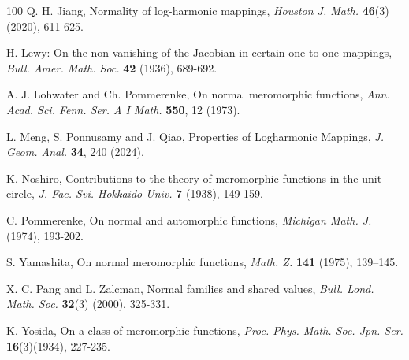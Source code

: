 \documentclass[a4paper,12pt]{amsart}
\theoremstyle{plain}
\theoremstyle{definition}
\begin{document}
\begin{thebibliography}{100}
	 {\sc Q. H. Jiang}, Normality of log-harmonic mappings, \textit{Houston J. Math.} \textbf{46}(3) (2020), 611-625.
	
	 {\sc H. Lewy}: On the non-vanishing of the Jacobian in certain one-to-one mappings, \textit{Bull. Amer. Math. Soc.} \textbf{42} (1936), 689-692.
	
	 {\sc A. J. Lohwater} and {\sc Ch. Pommerenke}, On normal meromorphic functions, \textit{Ann. Acad. Sci. Fenn. Ser. A I Math.} \textbf{550}, 12 (1973).
	
	 {\sc L. Meng, S. Ponnusamy} and {\sc J. Qiao}, Properties of Logharmonic Mappings, \textit{J. Geom. Anal.} \textbf{34}, 240 (2024).
	
	 {\sc K. Noshiro}, Contributions to the theory of meromorphic functions in the unit circle, \textit{J. Fac. Svi. Hokkaido Univ.} \textbf{7} (1938), 149-159.
	
	 {\sc C. Pommerenke}, On normal and automorphic functions, \textit{Michigan Math. J.} (1974), 193-202. 
	
	 {\sc S. Yamashita}, On normal meromorphic functions, \textit{Math. Z.} \textbf{141} (1975), 139–145.
	
	 {\sc X. C. Pang} and {\sc L. Zalcman}, Normal families and shared values, \textit{Bull. Lond. Math. Soc.} \textbf{32}(3) (2000), 325-331.
	
	 {\sc K. Yosida}, On a class of meromorphic functions, \textit{Proc. Phys. Math. Soc. Jpn. Ser.} \textbf{16}(3)(1934), 227-235.
	
\end{thebibliography}
\end{document}
